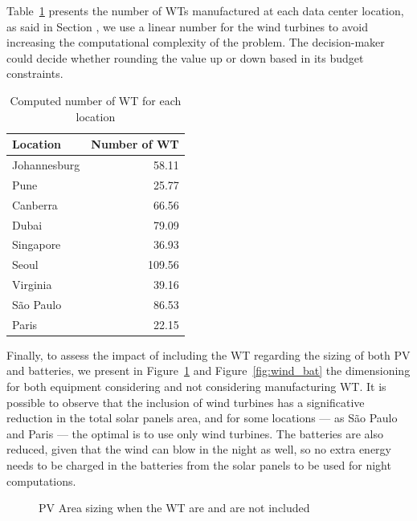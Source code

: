 Table~\ref{tab:results_wt} presents the number of WTs manufactured at each data center location, as said in Section \label{sec:ex_model_wt}, we use a linear number for the wind turbines to avoid increasing the computational complexity of the problem. The decision-maker could decide whether rounding the value up or down based in its budget constraints.


\begin{table}[h]
  \caption{Computed number of WT for each location}\label{tab:results_wt} \centering
  \begin{tabular}{|l|r|}
  \hline
    
  \textbf{Location} &   \textbf{Number of WT} \\
  \hline
  Johannesburg & 58.11   \\
  \hline
  Pune  & 25.77 \\
  \hline
  Canberra  & 66.56 \\
  \hline
  Dubai   &  79.09  \\
  \hline
  Singapore & 36.93  \\
  \hline     
  Seoul    & 109.56  \\
  \hline
  Virginia   & 39.16 \\
  \hline
  São Paulo   & 86.53 \\
  \hline 
  Paris    &   22.15 \\
  \hline
  
\end{tabular}  
\end{table}



Finally, to assess the impact of including the WT regarding the sizing of both PV and batteries, we present in Figure~\ref{fig:wind_pv} and Figure~\ref{fig:wind_bat}  the dimensioning for both equipment considering and not considering manufacturing WT.  It is possible to observe that the inclusion of wind turbines has a significative reduction in the total solar panels area, and for some locations --- as São Paulo and Paris --- the optimal is to use only wind turbines. The batteries are also reduced, given that the wind can blow in the night as well, so no extra energy needs to be charged in the batteries from the solar panels to be used for night computations.



\begin{figure}[H]
  \centering
  {}
  \caption{PV Area sizing when the WT are and are not included }
  \label{fig:wind_pv}
\end{figure}


